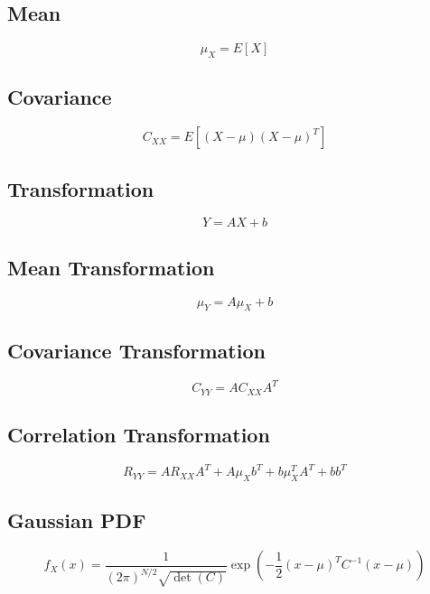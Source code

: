 \documentclass[12pt,a4paper]{article}
\begin{document}
\subsection*{Mean}
\[
\mu_X = E[X]
\]

\subsection*{Covariance}
\[
C_{XX} = E[(X-\mu)(X-\mu)^T]
\]

\subsection*{Transformation}
\[
Y = AX + b
\]

\subsection*{Mean Transformation}
\[
\mu_Y = A\mu_X + b
\]

\subsection*{Covariance Transformation}
\[
C_{YY} = A C_{XX} A^T
\]

\subsection*{Correlation Transformation}
\[
R_{YY} = A R_{XX} A^T + A\mu_X b^T + b\mu_X^T A^T + bb^T
\]

\subsection*{Gaussian PDF}
\[
f_X(x) =
\frac{1}{(2\pi)^{N/2} \sqrt{\det(C)}}
\exp\left(-\frac{1}{2}(x-\mu)^T C^{-1} (x-\mu)\right)
\]
\end{document}
